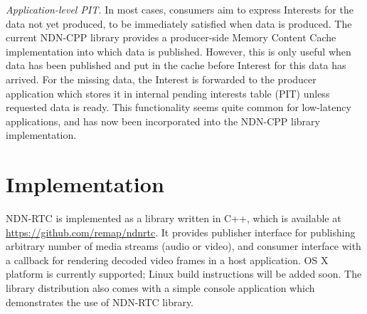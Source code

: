\documentclass{icn/sig-alternate-2012} %
\newcommand{\ndnrtcName}{NDN-RTC} %
\begin{document}










\textit{Application-level PIT.} In most cases, consumers aim to express Interests for the data not yet produced, to be immediately satisfied when data is produced. The current NDN-CPP library provides a producer-side Memory Content Cache implementation into which data is published. However, this is only useful when data has been published and put in the cache before Interest for this data has arrived. For the missing data, the Interest is forwarded to the producer application which stores it in internal pending interests table (PIT) unless requested data is ready. This functionality seems quite common for low-latency applications, and has now been incorporated into the NDN-CPP library implementation.

\section{Implementation}
\label{sec:imp}
\ndnrtcName{} is implemented as a library written in C++, which is available at \url{https://github.com/remap/ndnrtc}. 
It provides publisher interface for publishing arbitrary number of media streams (audio or video), and consumer interface with a callback for rendering decoded video frames in a host application. OS X platform is currently supported; Linux build instructions will be added soon. 
The library distribution also comes with a simple console application which demonstrates the use of \ndnrtcName{} library.
\end{document}
